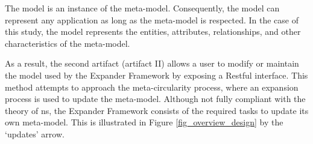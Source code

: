   The model is an instance of the meta-model. Consequently, the model can represent any
  application as long as the meta-model is respected. In the case of this study, the model
  represents the entities, attributes, relationships, and other characteristics of the
  meta-model.
  
  As a result, the second artifact (artifact II) allows a user to modify or maintain the
  model used by the Expander Framework by exposing a Restful interface. This method
  attempts to approach the meta-circularity process, where an expansion process is used to
  update the meta-model. Although not fully compliant with the theory of \gls{ns}, the
  Expander Framework consists of the required tasks to update its own meta-model. This is
  illustrated in Figure \ref{fig_overview_design} by the \enquote*{updates} arrow.






